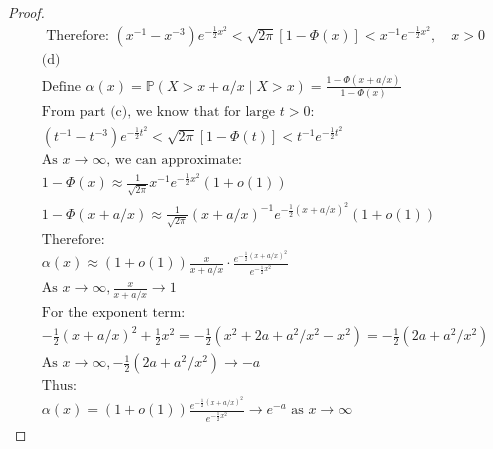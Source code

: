 \documentclass[letterpaper, 11pt]{article}
\newcommand{\1}{\mathds{1}}	%
\theoremstyle{definition}
\begin{document}
\begin{proof}
\begin{align*}
                    &\text{Therefore: } (x^{-1} - x^{-3})e^{-\frac{1}{2}x^2} < \sqrt{2\pi}[1 - \Phi(x)] < x^{-1}e^{-\frac{1}{2}x^2}, \quad x > 0
                    \end{align*}
                    \begin{align*}
                        &\text{(d)}\\ &\text{Define } \alpha(x) = \mathbb{P}(X > x + a/x \mid X > x) = \frac{1 - \Phi(x + a/x)}{1 - \Phi(x)}\\
                        &\text{From part (c), we know that for large } t > 0:\\
                        &(t^{-1} - t^{-3})e^{-\frac{1}{2}t^2} < \sqrt{2\pi}[1 - \Phi(t)] < t^{-1}e^{-\frac{1}{2}t^2}\\
                        &\text{As } x \to \infty \text{, we can approximate:}\\
                        &1 - \Phi(x) \approx \frac{1}{\sqrt{2\pi}}x^{-1}e^{-\frac{1}{2}x^2}(1 + o(1))\\
                        &1 - \Phi(x + a/x) \approx \frac{1}{\sqrt{2\pi}}(x + a/x)^{-1}e^{-\frac{1}{2}(x + a/x)^2}(1 + o(1))\\
                        &\text{Therefore:}\\
                        &\alpha(x) \approx (1 + o(1))\frac{x}{x + a/x} \cdot \frac{e^{-\frac{1}{2}(x + a/x)^2}}{e^{-\frac{1}{2}x^2}}\\
                        &\text{As } x \to \infty, \frac{x}{x + a/x} \to 1\\
                        &\text{For the exponent term:}\\
                        &-\frac{1}{2}(x + a/x)^2 + \frac{1}{2}x^2 = -\frac{1}{2}(x^2 + 2a + a^2/x^2 - x^2) = -\frac{1}{2}(2a + a^2/x^2)\\
                        &\text{As } x \to \infty, -\frac{1}{2}(2a + a^2/x^2) \to -a\\
                        &\text{Thus:}\\
                        &\alpha(x) = (1 + o(1))\frac{e^{-\frac{1}{2}(x + a/x)^2}}{e^{-\frac{1}{2}x^2}} \to e^{-a} \text{ as } x \to \infty
                                          \end{align*}
    \end{proof}
\end{document}
